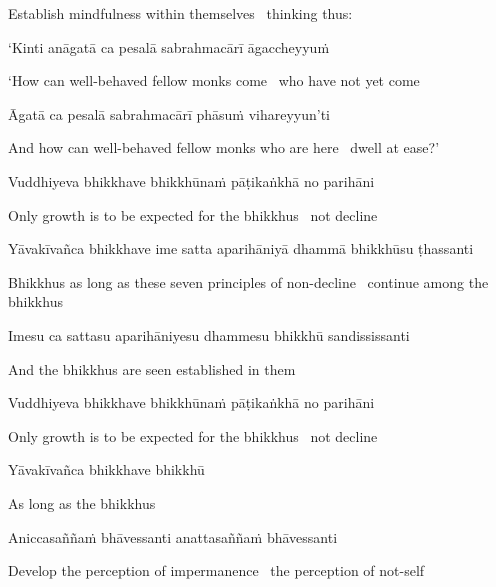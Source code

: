 \begin{english}
  Establish mindfulness within themselves \breathmark\ thinking thus:
\end{english}

‘Kinti anāgatā ca pesalā sabrahmacārī āgaccheyyuṁ

\begin{english}
  ‘How can well-behaved fellow monks come \breathmark\ who have not yet come
\end{english}

Āgatā ca pesalā sabrahmacārī phāsuṁ vihareyyun’ti

\begin{english}
  And how can well-behaved fellow monks who are here \breathmark\ dwell at ease?’
\end{english}

Vuddhiyeva bhikkhave bhikkhūnaṁ pāṭikaṅkhā no parihāni

\begin{english}
  Only growth is to be expected for the bhikkhus \breathmark\ not decline
\end{english}

Yāvakīvañca bhikkhave ime satta aparihāniyā dhammā bhikkhūsu ṭhassanti

\begin{english}
  Bhikkhus as long as these seven principles of non-decline \breathmark\ continue among the bhikkhus
\end{english}

Imesu ca sattasu aparihāniyesu dhammesu bhikkhū sandississanti

\begin{english}
  And the bhikkhus are seen established in them
\end{english}

Vuddhiyeva bhikkhave bhikkhūnaṁ pāṭikaṅkhā no parihāni

\begin{english}
  Only growth is to be expected for the bhikkhus \breathmark\ not decline
\end{english}

\suttaRef{[AN 7.23]}

Yāvakīvañca bhikkhave bhikkhū

\begin{english}
  As long as the bhikkhus
\end{english}

Aniccasaññaṁ bhāvessanti anattasaññaṁ bhāvessanti

\begin{english}
  Develop the perception of impermanence \breathmark\ the perception of not-self
\end{english}

